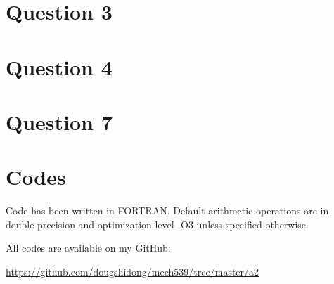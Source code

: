\documentclass[letterpaper,12pt,]{article}
\begin{document}
\section*{Question 3}



\section*{Question 4}



\section*{Question 7}


\section*{Codes}

Code has been written in FORTRAN. Default arithmetic operations are in double precision and optimization level -O3 unless specified otherwise.

All codes are available on my GitHub:

\url{https://github.com/dougshidong/mech539/tree/master/a2}
\end{document}
